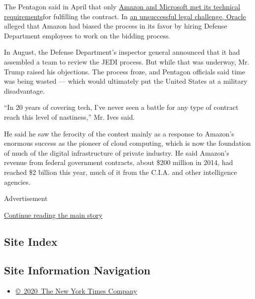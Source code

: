 The Pentagon said in April that only
\href{https://www.nytimes3xbfgragh.onion/2019/04/10/technology/amazon-microsoft-jedi-pentagon.html}{Amazon
and Microsoft met its technical requirements}for fulfilling the
contract. In
\href{https://www.nytimes3xbfgragh.onion/2019/03/20/technology/military-contract-deap-ubhi.html?module=inline}{an
unsuccessful legal challenge, Oracle} alleged that Amazon had biased the
process in its favor by hiring Defense Department employees to work on
the bidding process.

In August, the Defense Department's inspector general announced that it
had assembled a team to review the JEDI process. But while that was
underway, Mr. Trump raised his objections. The process froze, and
Pentagon officials said time was being wasted --- which would ultimately
put the United States at a military disadvantage.

``In 20 years of covering tech, I've never seen a battle for any type of
contract reach this level of nastiness,'' Mr. Ives said.

He said he saw the ferocity of the contest mainly as a response to
Amazon's enormous success as the pioneer of cloud computing, which is
now the foundation of much of the digital infrastructure of private
industry. He said Amazon's revenue from federal government contracts,
about \$200 million in 2014, had reached \$2 billion this year, much of
it from the C.I.A. and other intelligence agencies.

Advertisement

\protect\hyperlink{after-bottom}{Continue reading the main story}

\hypertarget{site-index}{%
\subsection{Site Index}\label{site-index}}

\hypertarget{site-information-navigation}{%
\subsection{Site Information
Navigation}\label{site-information-navigation}}

\begin{itemize}
\tightlist
\item
  \href{https://help.nytimes3xbfgragh.onion/hc/en-us/articles/115014792127-Copyright-notice}{©~2020~The
  New York Times Company}
\end{itemize}


